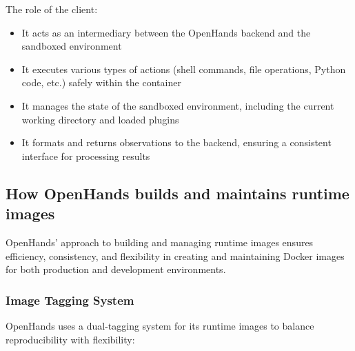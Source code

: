 The role of the client:
\begin{itemize}
    \item It acts as an intermediary between the OpenHands backend and the sandboxed environment
    \item It executes various types of actions (shell commands, file operations, Python code, etc.) safely within the container
    \item It manages the state of the sandboxed environment, including the current working directory and loaded plugins
    \item It formats and returns observations to the backend, ensuring a consistent interface for processing results
\end{itemize}


\subsection{How OpenHands builds and maintains runtime images}

OpenHands' approach to building and managing runtime images ensures efficiency, consistency, and flexibility in creating and maintaining Docker images for both production and development environments.


\subsubsection{Image Tagging System}

OpenHands uses a dual-tagging system for its runtime images to balance reproducibility with flexibility:

